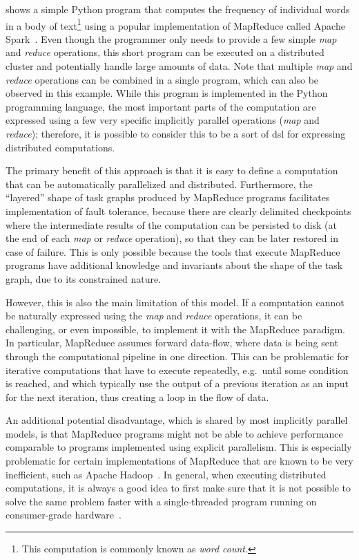  shows a simple Python program that computes the frequency of
individual words in a body of text\footnote{This computation is commonly known as \emph{word count}.} using a popular implementation of
MapReduce called Apache Spark~\cite{spark}. Even though the programmer only needs to
provide a few simple \emph{map} and \emph{reduce} operations, this short
program can be executed on a distributed cluster and potentially handle large amounts of data. Note
that multiple \emph{map} and \emph{reduce} operations can be combined in a
single program, which can also be observed in this example. While this program is implemented in
the Python programming language, the most important parts of the computation are expressed using a
few very specific implicitly parallel operations (\emph{map} and
\emph{reduce}); therefore, it is possible to consider this to be a sort of
\gls{dsl} for expressing distributed computations.

The primary benefit of this approach is that it is easy to define a computation that can be
automatically parallelized and distributed. Furthermore, the ``layered'' shape of task graphs
produced by MapReduce programs facilitates implementation of fault tolerance, because there are
clearly delimited checkpoints where the intermediate results of the computation can be persisted to
disk (at the end of each \emph{map} or \emph{reduce} operation), so that
they can be later restored in case of failure. This is only possible because the tools that execute
MapReduce programs have additional knowledge and invariants about the shape of the task graph, due
to its constrained nature.

However, this is also the main limitation of this model. If a computation cannot be naturally
expressed using the \emph{map} and \emph{reduce} operations, it can be
challenging, or even impossible, to implement it with the MapReduce paradigm. In particular,
MapReduce assumes forward data-flow, where data is being sent through the computational pipeline in
one direction. This can be problematic for iterative computations that have to execute repeatedly,
e.g.\ until some condition is reached, and which typically use the output of a previous iteration
as an input for the next iteration, thus creating a loop in the flow of data.

An additional potential disadvantage, which is shared by most implicitly parallel models, is that
MapReduce programs might not be able to achieve performance comparable to programs implemented
using explicit parallelism. This is especially problematic for certain implementations of MapReduce
that are known to be very inefficient, such as Apache Hadoop~\cite{hadoop}. In general,
when executing distributed computations, it is always a good idea to first make sure that it is not
possible to solve the same problem faster with a single-threaded program running on consumer-grade
hardware~\cite{cost}.

